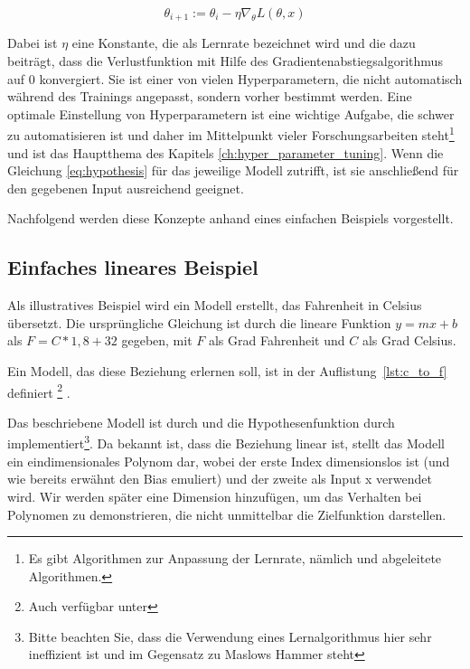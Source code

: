 \begin{equation}
    \theta_{i+1} := \theta_i - \eta \nabla_\theta L(\theta, x)
    \label{eq:gradient_descent}
\end{equation}

Dabei ist $\eta$ eine Konstante, die als Lernrate bezeichnet wird und die dazu beiträgt, dass die Verlustfunktion mit Hilfe des Gradientenabstiegsalgorithmus auf 0 konvergiert.
Sie ist einer von vielen Hyperparametern, die nicht automatisch während des Trainings angepasst, sondern vorher bestimmt werden.
Eine optimale Einstellung von Hyperparametern ist eine wichtige Aufgabe, die schwer zu automatisieren ist und daher im Mittelpunkt vieler Forschungsarbeiten steht\footnote{Es gibt Algorithmen zur Anpassung der Lernrate, nämlich  \cite{Duchi2010} und abgeleitete Algorithmen.} und ist das Hauptthema des Kapitels \ref{ch:hyper_parameter_tuning}.
Wenn die Gleichung \eqref{eq:hypothesis} für das jeweilige Modell zutrifft, ist sie anschließend für den gegebenen Input ausreichend geeignet.

Nachfolgend werden diese Konzepte anhand eines einfachen Beispiels vorgestellt.

\subsection{Einfaches lineares Beispiel} \label{ch:simple_linear_example}

Als illustratives Beispiel wird ein Modell erstellt, das Fahrenheit in Celsius übersetzt.
Die ursprüngliche Gleichung ist durch die lineare Funktion $y = mx + b$ als $F = C * 1,8 + 32$ gegeben, mit $F$ als Grad Fahrenheit und $C$ als Grad Celsius.

Ein Modell, das diese Beziehung erlernen soll, ist in der Auflistung~\ref{lst:c_to_f} definiert \footnote{Auch verfügbar unter } .



Das beschriebene Modell ist durch  und die Hypothesenfunktion durch  implementiert\footnote{Bitte beachten Sie, dass die Verwendung eines Lernalgorithmus hier sehr ineffizient ist und im Gegensatz zu Maslows Hammer steht}.
Da bekannt ist, dass die Beziehung linear ist, stellt das Modell ein eindimensionales Polynom dar, wobei der erste Index dimensionslos ist (und wie bereits erwähnt den Bias emuliert) und der zweite als Input x verwendet wird.
Wir werden später eine Dimension hinzufügen, um das Verhalten bei Polynomen zu demonstrieren, die nicht unmittelbar die Zielfunktion darstellen.

